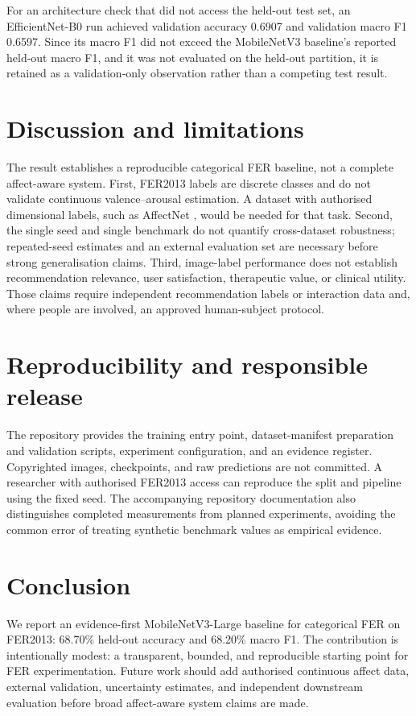 \documentclass[10pt,conference]{IEEEtran}
\begin{document}
For an architecture check that did not access the held-out test set, an EfficientNet-B0 run achieved validation accuracy 0.6907 and validation macro F1 0.6597. Since its macro F1 did not exceed the MobileNetV3 baseline's reported held-out macro F1, and it was not evaluated on the held-out partition, it is retained as a validation-only observation rather than a competing test result.

\section{Discussion and limitations}
The result establishes a reproducible categorical FER baseline, not a complete affect-aware system. First, FER2013 labels are discrete classes and do not validate continuous valence--arousal estimation. A dataset with authorised dimensional labels, such as AffectNet \cite{mollahosseini2017affectnet}, would be needed for that task. Second, the single seed and single benchmark do not quantify cross-dataset robustness; repeated-seed estimates and an external evaluation set are necessary before strong generalisation claims. Third, image-label performance does not establish recommendation relevance, user satisfaction, therapeutic value, or clinical utility. Those claims require independent recommendation labels or interaction data and, where people are involved, an approved human-subject protocol.

\section{Reproducibility and responsible release}
The repository provides the training entry point, dataset-manifest preparation and validation scripts, experiment configuration, and an evidence register. Copyrighted images, checkpoints, and raw predictions are not committed. A researcher with authorised FER2013 access can reproduce the split and pipeline using the fixed seed. The accompanying repository documentation also distinguishes completed measurements from planned experiments, avoiding the common error of treating synthetic benchmark values as empirical evidence.

\section{Conclusion}
We report an evidence-first MobileNetV3-Large baseline for categorical FER on FER2013: 68.70\% held-out accuracy and 68.20\% macro F1. The contribution is intentionally modest: a transparent, bounded, and reproducible starting point for FER experimentation. Future work should add authorised continuous affect data, external validation, uncertainty estimates, and independent downstream evaluation before broad affect-aware system claims are made.



\end{document}

